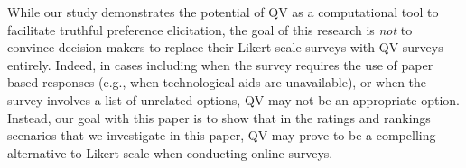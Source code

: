 While our study demonstrates the potential of QV as a computational tool to facilitate truthful preference elicitation, the goal of this research is \textit{not} to convince decision-makers to replace their Likert scale surveys with QV surveys entirely. Indeed, in cases including when the survey requires the use of paper based responses (e.g., when technological aids are unavailable), or when the survey involves a list of unrelated options, QV may not be an appropriate option. Instead, our goal with this paper is to show that in the ratings and rankings scenarios that we investigate in this paper, QV may prove to be a compelling alternative to Likert scale when conducting online surveys.  












